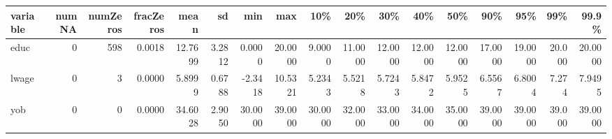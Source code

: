 
\begin{tabular}{lrrrrrrrrrrrrrrrr}
\toprule
variable & numNA & numZeros & fracZeros & mean & sd & min & max & 10\% & 20\% & 30\% & 40\% & 50\% & 90\% & 95\% & 99\% & 99.9\%\\
\midrule
educ & 0 & 598 & 0.0018 & 12.7699 & 3.2812 & 0.0000 & 20.0000 & 9.0000 & 11.0000 & 12.0000 & 12.0000 & 12.0000 & 17.0000 & 19.0000 & 20.000 & 20.0000\\
lwage & 0 & 3 & 0.0000 & 5.8999 & 0.6788 & -2.3418 & 10.5321 & 5.2343 & 5.5218 & 5.7243 & 5.8472 & 5.9525 & 6.5567 & 6.8004 & 7.274 & 7.9495\\
yob & 0 & 0 & 0.0000 & 34.6028 & 2.9050 & 30.0000 & 39.0000 & 30.0000 & 32.0000 & 33.0000 & 34.0000 & 35.0000 & 39.0000 & 39.0000 & 39.000 & 39.0000\\
\bottomrule
\end{tabular}
